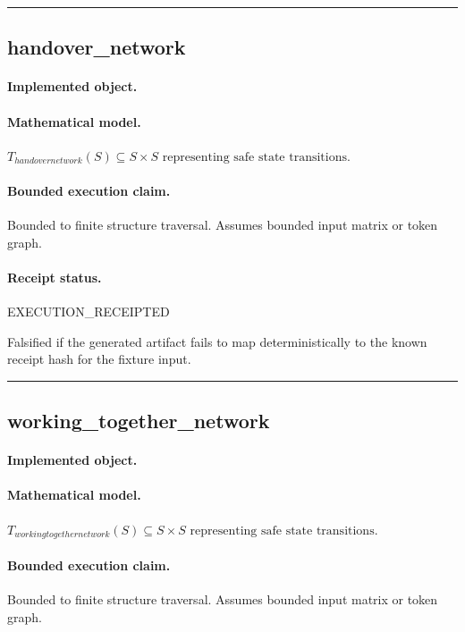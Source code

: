 \vspace{1em}\hrule\vspace{1em}
\subsection{handover\_network}
\paragraph{Implemented object.} 
\paragraph{Mathematical model.} $T_{handovernetwork}(S) \subseteq S \times S \text{ representing safe state transitions}.$
\paragraph{Bounded execution claim.} Bounded to finite structure traversal. Assumes bounded input matrix or token graph.
\paragraph{Receipt status.} EXECUTION\_RECEIPTED
\begin{falsifier}
Falsified if the generated artifact fails to map deterministically to the known receipt hash for the fixture input.
\end{falsifier}

\vspace{1em}\hrule\vspace{1em}
\subsection{working\_together\_network}
\paragraph{Implemented object.} 
\paragraph{Mathematical model.} $T_{workingtogethernetwork}(S) \subseteq S \times S \text{ representing safe state transitions}.$
\paragraph{Bounded execution claim.} Bounded to finite structure traversal. Assumes bounded input matrix or token graph.
